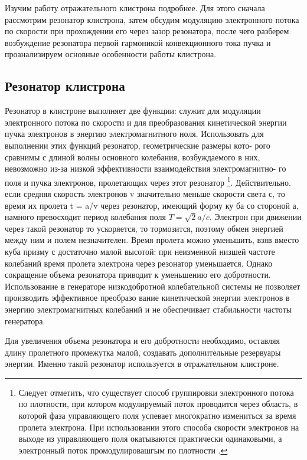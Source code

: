 Изучим работу отражательного клистрона подробнее. Для этого сначала
рассмотрим резонатор клистрона, затем обсудим модуляцию электронного
потока по скорости при прохождении его через зазор резонатора, после чего
разберем возбуждение резонатора первой гармоникой конвекционного тока
пучка и проанализируем основные особенности работы клистрона.


\subsection{Резонатор клистрона}

Резонатор в клистроне выполняет две функции: служит для модуляции
электронного потока по скорости и для преобразования кинетической энер­гии пучка электронов в энергию электромагнитного ноля. Использовать
для выполнении этих функций резонатор, геометрические размеры кото-
рого сравнимы с длиной волны основного колебания, возбуждаемого в них,
невозможно из-за низкой эффективности взаимодействия электромагнитно-
го поля и пучка электронов, пролетающих через этот резонатор
\footnote{Следует отметить, что существует способ группировки электронного потока по плотности,
при котором модулируемый поток проводится через область, в которой фаза управляющего поля
успевает многократно измениться за время пролета электрона. При использовании этого способа скорости электронов на выходе из управляющего поля окатываются практически одинаковыми,
а электронный поток промодулировашгым по плотности \cite{litlink3}.}. 
Действи­тельно. если средняя скорость электронов v значительно меньше скорости
света с, то время их пролета t = a/v через резонатор, имеющий форму ку­
ба со стороной а, намного превосходит период колебания поля $T = \sqrt { 2 } a / c$.
Электрон при движении через такой резонатор то ускоряется, то тормозится,
поэтому обмен энергией между ним и полем незначителен. Время пролета
можно уменьшить, взяв вместо куба призму с достаточно малой высотой:
при неизменной низшей частоте колебаний время пролета электрона через
резонатор уменьшается. Однако сокращение объема резонатора приводит к
уменьшению его добротности. Использование в генераторе низкодобротной
колебательной системы не позволяет производить эффективное преобразо­
вание кинетической энергии электронов в энергию электромагнитных коле­баний и не обеспечивает стабильности частоты генератора.

Для увеличения объема резонатора и его добротности необходимо, остав­ляя длину пролетного промежутка малой, создавать дополнительные резервуары энергии. Именно такой резонатор используется в отражательном
клистроне.

